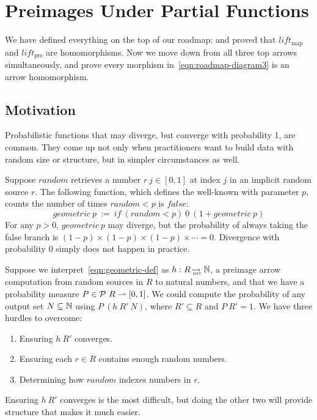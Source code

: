 \documentclass[preprint]{sigplanconf}
\newcommand{\arrow}{\rightsquigarrow}
\newcommand{\pto}{\rightharpoonup}
\newcommand{\arrowlift}{\ensuremath{lift}}
\newcommand{\map}{_\mathrm{map}}
\newcommand{\liftmap}{\arrowlift\map}
\newcommand{\pre}{_\mathrm{pre}}
\DeclareMathOperator{\preto}{\arrow_{\mspace{-19mu}\pre}}
\newcommand{\liftpre}{\arrowlift\pre}
\begin{document}

\section{Preimages Under Partial Functions}

We have defined everything on the top of our roadmap:
and proved that $\liftmap$ and $\liftpre$ are homomorphisms.
Now we move down from all three top arrows simultaneously, and prove every morphism in~\eqref{eqn:roadmap-diagram3} is an arrow homomorphism.

\subsection{Motivation}

Probabilistic functions that may diverge, but converge with probability 1, are common.
They come up not only when practitioners want to build data with random size or structure, but in simpler circumstances as well.

Suppose $random$ retrieves a number $r~j \in [0,1]$ at index $j$ in an implicit random source $r$.
The following function, which defines the well-known  with parameter $p$, counts the number of times $random < p$ is $false$:
\begin{equation}
	geometric~p \ := \ if~(random < p)~0~(1 + geometric~p)
\label{eqn:geometric-def}
\end{equation}
For any $p > 0$, $geometric~p$ may diverge, but the probability of always taking the false branch is $(1-p) \times (1-p) \times (1-p) \times \cdots = 0$.
Divergence with probability $0$ simply does not happen in practice.

Suppose we interpret~\eqref{eqn:geometric-def} as $h : R \preto \Nat$, a preimage arrow computation from random sources in $R$ to natural numbers, and that we have a probability measure $P \in \powerset~R \pto [0,1]$.
We could compute the probability of any output set $N \subseteq \mathbb{N}$ using $P~(h~R'~N)$, where $R' \subseteq R$ and $P~R' = 1$. We have three hurdles to overcome:
\begin{enumerate}
	\item Ensuring $h~R'$ converges.
	\item Ensuring each $r \in R$ contains enough random numbers.
	\item Determining how $random$ indexes numbers in $r$.
\end{enumerate}
Ensuring $h~R'$ converges is the most difficult, but doing the other two will provide structure that makes it much easier.
\end{document}
